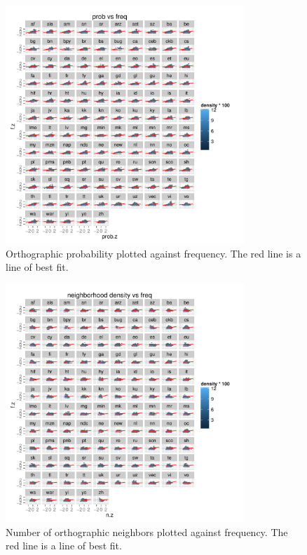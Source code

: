 \documentclass{article}
\begin{document}
\begin{figure}[htbp]
  \centering
  \includegraphics[width=0.8\textwidth]{PDFs/big_cor2_probvfreq.pdf}
  \caption{Orthographic probability plotted against frequency. The red line is a line of best fit.}
  \label{probvfreq}
\end{figure}

\begin{figure}[htbp]
  \centering
  \includegraphics[width=0.8\textwidth]{PDFs/big_cor2_neighborsvsfreq.pdf}
  \caption{Number of orthographic neighbors plotted against frequency. The red line is a line of best fit.}
  \label{neighborsvfreq}
\end{figure}
\end{document}
